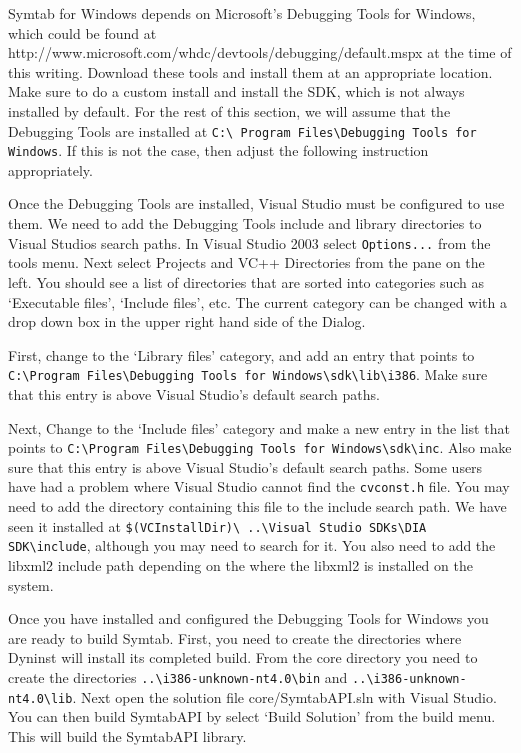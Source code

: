 Symtab for Windows depends on Microsoft's Debugging Tools for Windows, which
could be found at http://www.microsoft.com/whdc/devtools/debugging/default.mspx
at the time of this writing. Download these tools and install them at an
appropriate location. Make sure to do a custom install and install the SDK,
which is not always installed by default. For the rest of this section, we will
assume that the Debugging Tools are installed at \texttt{C:\textbackslash
    Program Files\textbackslash Debugging
Tools for Windows}. If this is not the case, then adjust the following
instruction appropriately.

Once the Debugging Tools are installed, Visual Studio must be configured to use
them. We need to add the Debugging Tools include and library directories to
Visual Studios search paths. In Visual Studio 2003 select \texttt{Options...} from the
tools menu. Next select Projects and VC++ Directories from the pane on the left.
You should see a list of directories that are sorted into categories such as
`Executable files', `Include files', etc. The current category can
be changed with a drop down box in the upper right hand side of the Dialog.

First, change to the `Library files' category, and add an entry that
points to \\
\texttt{C:\textbackslash Program Files\textbackslash Debugging Tools
for Windows\textbackslash sdk\textbackslash lib\textbackslash i386}. Make sure
that this entry is above Visual Studio's default search paths.

Next, Change to the `Include files' category and make a new entry in the
list that points to \texttt{C:\textbackslash Program Files\textbackslash Debugging Tools for
Windows\textbackslash sdk\textbackslash inc}. Also
make sure that this entry is above Visual Studio's default search paths. Some
users have had a problem where Visual Studio cannot find the \texttt{cvconst.h} file. You
may need to add the directory containing this file to the include search path.
We have seen it installed at \texttt{\$(VCInstallDir)\textbackslash
    ..\textbackslash Visual Studio SDKs\textbackslash DIA
SDK\textbackslash include}, although you may need to search for it. You also need to add the
libxml2 include path depending on the where the libxml2 is installed on the
system.

Once you have installed and configured the Debugging Tools for Windows
you are ready to build Symtab. First, you need to create the directories where
Dyninst will install its completed build. From the core directory you need to
create the directories \texttt{..\textbackslash i386-unknown-nt4.0\textbackslash bin} and
\texttt{..\textbackslash i386-unknown-nt4.0\textbackslash lib}.
Next open the solution file core/SymtabAPI.sln with Visual Studio.   You can
then build SymtabAPI by select `Build Solution' from the build menu. This
will build the SymtabAPI library.

